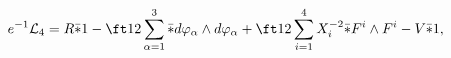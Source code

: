 \begin{equation}
e^{-1}{\cal L}_4 = R\bar *1-\ft12\sum_{\alpha=1}^3\bar*d\varphi_\alpha\wedge
d\varphi_\alpha+\ft12\sum_{i=1}^4 X_i^{-2}\bar*F^i\wedge F^i-V\bar*1,
\label{eq:d4n2lag}
\end{equation}

